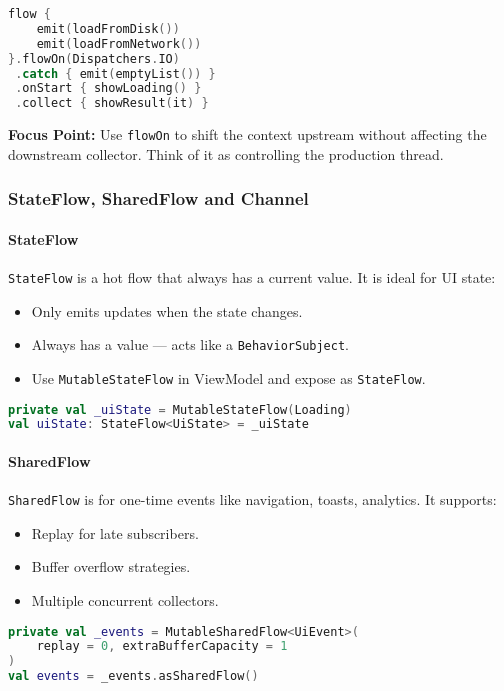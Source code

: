 \documentclass[a4paper,12pt]{article}
\begin{document}
\begin{lstlisting}[language=Kotlin]
flow {
    emit(loadFromDisk())
    emit(loadFromNetwork())
}.flowOn(Dispatchers.IO)
 .catch { emit(emptyList()) }
 .onStart { showLoading() }
 .collect { showResult(it) }
\end{lstlisting}

\textbf{Focus Point:} Use \texttt{flowOn} to shift the context upstream without affecting the downstream collector. Think of it as controlling the production thread.

\subsubsection{StateFlow, SharedFlow and Channel}

\paragraph{StateFlow}
\texttt{StateFlow} is a hot flow that always has a current value. It is ideal for UI state:

\begin{itemize}
  \item Only emits updates when the state changes.
  \item Always has a value — acts like a \texttt{BehaviorSubject}.
  \item Use \texttt{MutableStateFlow} in ViewModel and expose as \texttt{StateFlow}.
\end{itemize}

\begin{lstlisting}[language=Kotlin]
private val _uiState = MutableStateFlow(Loading)
val uiState: StateFlow<UiState> = _uiState
\end{lstlisting}

\paragraph{SharedFlow}
\texttt{SharedFlow} is for one-time events like navigation, toasts, analytics. It supports:

\begin{itemize}
  \item Replay for late subscribers.
  \item Buffer overflow strategies.
  \item Multiple concurrent collectors.
\end{itemize}

\begin{lstlisting}[language=Kotlin]
private val _events = MutableSharedFlow<UiEvent>(
    replay = 0, extraBufferCapacity = 1
)
val events = _events.asSharedFlow()
\end{lstlisting}
\end{document}
